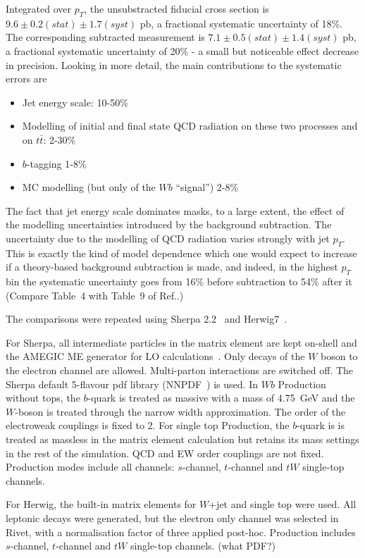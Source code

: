\documentclass[11pt]{cernrep}
\begin{document}
Integrated over $p_T$, the unsubstracted fiducial cross section is
$9.6 \pm 0.2 (stat) \pm 1.7 (syst)$ pb, a fractional systematic uncertainty of 18\%.
The corresponding subtracted measurement is 
$7.1 \pm 0.5 (stat) \pm 1.4 (syst)$ pb, a fractional systematic uncertainty of 20\%
- a small but noticeable effect decrease in precision. Looking in more detail, the main contributions 
to the systematic errors are
\begin{itemize}
\item Jet energy scale: 10-50\%
\item Modelling of initial and final state QCD radiation on these two processes and on $t\bar{t}$: 2-30\%
\item $b$-tagging 1-8\%
\item MC modelling (but only of the $Wb$ “signal”) 2-8\%
\end{itemize}
The fact that jet energy scale dominates masks, to a large extent, the effect of the modelling uncertainties introduced by
the background subtraction.
The uncertainty due to the modelling of QCD radiation varies strongly with jet $p_T$. 
This is exactly the kind of model dependence which one would expect to increase if a theory-based background
subtraction is made, and indeed, in the highest $p_T$ bin the systematic uncertainty goes from 16\% before subtraction 
to 54\% after it (Compare Table~4 with Table~9 of Ref.\cite{Aad:2013vka}.) 

The comparisons were repeated using Sherpa 2.2~\cite{Gleisberg:2008ta} and Herwig7~\cite{Bellm:2015jjp}. 

For Sherpa, all intermediate particles in the matrix element are kept on-shell and the AMEGIC 
ME generator for LO calculations~\cite{Krauss:2001iv}. Only decays of the $W$ boson to the 
electron channel are allowed. Multi-parton interactions are switched off. 
The Sherpa default 5-flavour pdf library (NNPDF~\cite{Ball:2014uwa}) is used. In $Wb$ Production
without tops, the $b$-quark is treated as massive with a mass of 4.75~GeV and the $W$-boson is
treated through the narrow width approximation. The order of the electroweak couplings is fixed to 2. 
For single top Production, the $b$-quark is is treated as massless in the matrix element calculation
but retains its mass settings in the rest of the simulation. QCD and EW order couplings are not
fixed. Production modes include all channels: $s$-channel, $t$-channel and $tW$ single-top channels.

For Herwig, the built-in matrix elements for $W$+jet and single top were used. All leptonic decays
were generated, but the electron only channel was selected in Rivet, with a normalisation factor
of three applied post-hoc. Production includes $s$-channel, $t$-channel and $tW$ single-top channels. (what PDF?)
\end{document}
